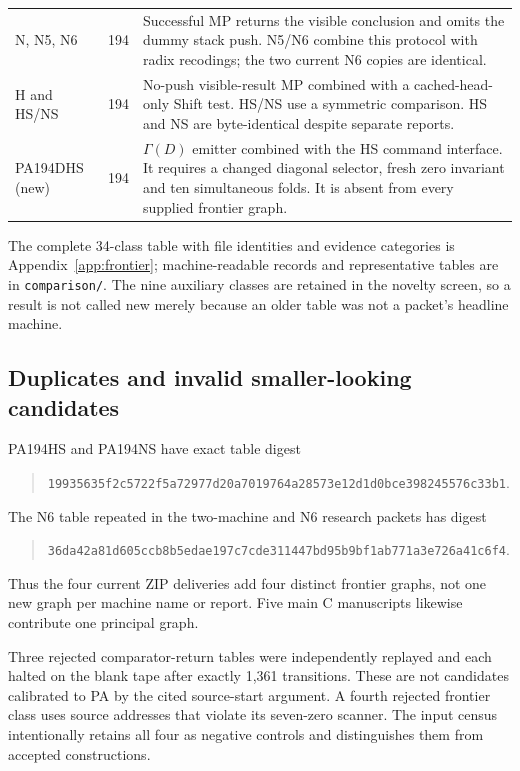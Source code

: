 \documentclass[11pt,letterpaper]{article}
\newcommand{\file}[1]{\texttt{\nolinkurl{#1}}}
\begin{document}
\begin{longtable}{@{}p{.20\linewidth}p{.13\linewidth}p{.60\linewidth}@{}}
N, N5, N6 & 194 & Successful MP returns the visible conclusion and omits the dummy stack push. N5/N6 combine this protocol with radix recodings; the two current N6 copies are identical.\\[4pt]
H and HS/NS & 194 & No-push visible-result MP combined with a cached-head-only Shift test. HS/NS use a symmetric comparison. HS and NS are byte-identical despite separate reports.\\[4pt]
PA194DHS (new) & 194 & $\Gamma(D)$ emitter combined with the HS command interface. It requires a changed diagonal selector, fresh zero invariant and ten simultaneous folds. It is absent from every supplied frontier graph.\\\bottomrule
\end{longtable}

The complete 34-class table with file identities and evidence categories is
Appendix~\ref{app:frontier}; machine-readable records and representative
tables are in \file{comparison/}. The nine auxiliary classes are retained
in the novelty screen, so a result is not called new merely because an
older table was not a packet's headline machine.

\subsection{Duplicates and invalid smaller-looking candidates}

PA194HS and PA194NS have exact table digest
\begin{quote}\small
\nolinkurl{19935635f2c5722f5a72977d20a7019764a28573e12d1d0bce398245576c33b1}.
\end{quote}
The N6 table repeated in the two-machine and N6 research packets has digest
\begin{quote}\small
\nolinkurl{36da42a81d605ccb8b5edae197c7cde311447bd95b9bf1ab771a3e726a41c6f4}.
\end{quote}
Thus the four current ZIP deliveries add four distinct frontier graphs,
not one new graph per machine name or report. Five main C manuscripts
likewise contribute one principal graph.

Three rejected comparator-return tables were independently replayed and
each halted on the blank tape after exactly 1,361 transitions. These are
not candidates calibrated to PA by the cited source-start argument. A
fourth rejected frontier class uses source addresses that violate its
seven-zero scanner. The input census intentionally retains all four as
negative controls and distinguishes them from accepted constructions.
\end{document}
